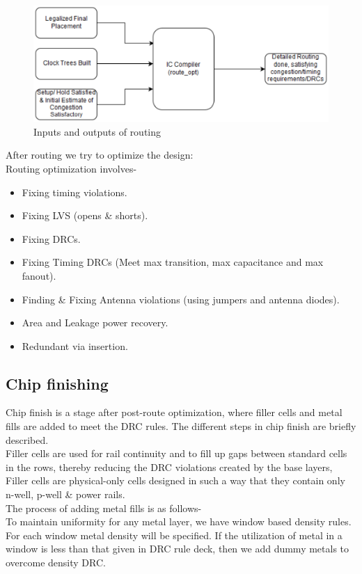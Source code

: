 \documentclass[../main.tex]{subfiles}
\begin{document}
\begin{figure}[h]
    \centering
    \includegraphics[width=15cm]{diagrams/IO_routing.PNG}
    \caption{ Inputs and outputs of routing}
    \label{fig:IO_routing}
\end{figure}
\newpage After routing we try to optimize the design:\\
Routing optimization involves-
\begin{itemize}
    \item Fixing timing violations.
    \item Fixing LVS (opens & shorts).
    \item Fixing DRCs.
    \item Fixing Timing DRCs (Meet max transition, max capacitance and max fanout).
    \item Finding & Fixing Antenna violations (using jumpers and antenna diodes).
    \item Area and Leakage power recovery.
    \item Redundant via insertion.
\end{itemize}






 \subsection{Chip finishing}
Chip finish is a stage after post-route optimization, where filler cells and metal fills are added to meet the DRC rules. The different steps in chip finish are briefly described.\\
Filler cells are used for rail continuity and to fill up gaps between standard cells in the rows, thereby reducing the DRC violations created by the base layers,
Filler cells are physical-only cells designed in such a way that they contain only n-well, p-well & power rails.\\
The process of adding metal fills is as follows-\\
To maintain uniformity for any metal layer, we have window based density rules.
For each window metal density will be specified.
If the utilization of metal in a window is less than that given in DRC rule deck, then we add dummy metals to overcome density DRC.
\end{document}

